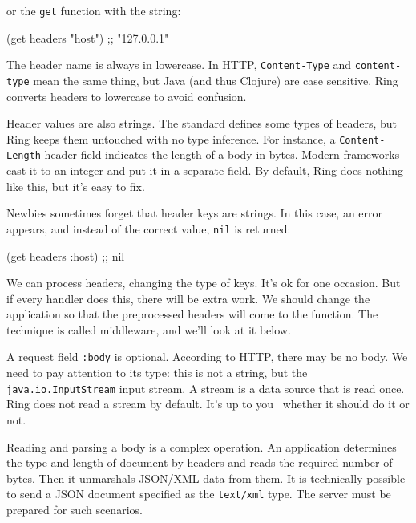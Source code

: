 \fi

\noindent or the \verb|get| function with the string:

\begin{clojure}
(get headers "host") ;; "127.0.0.1"
\end{clojure}


The header name is always in lowercase. In HTTP, \verb|Content-Type| and \verb|content-type| mean the same thing, but Java (and thus Clojure) are case sensitive. Ring converts headers to lowercase to avoid confusion.

Header values are also strings. The standard defines some types of headers, but Ring keeps them untouched with no type inference. For instance, a \verb|Content-Length| header field indicates the length of a body in bytes. Modern frameworks cast it to an integer and put it in a separate field. By default, Ring does nothing like this, but it's easy to fix.

Newbies sometimes forget that header keys are strings. In this case, an error appears, and instead of the correct value, \verb|nil| is returned:

\begin{clojure}
(get headers :host) ;; nil
\end{clojure}

We can process headers, changing the type of keys. It's ok for one occasion. But if every handler does this, there will be extra work. We should change the application so that the preprocessed headers will come to the function. The technique is called middleware, and we'll look at it below.


A request field \verb|:body| is optional. According to HTTP, there may be no body. We need to pay attention to its type: this is not a string, but the \verb|java.io.InputStream| input stream. A stream is a data source that is read once. Ring does not read a stream by default. It's up to you  whether it should do it or not.


Reading and parsing a body is a complex operation. An application determines the type and length of document by headers and reads the required number of bytes. Then it unmarshals JSON/XML data from them. It is technically possible to send a JSON document specified as the \verb|text/xml| type. The server must be prepared for such scenarios.

